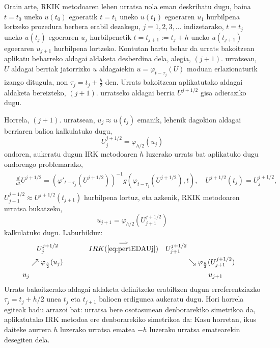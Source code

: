 Orain arte, RKIK metodoaren lehen urratsa nola eman deskribatu dugu, baina $t=t_0$ uneko $u(t_0)$ egoeratik $t=t_1$ uneko $u(t_1)$ egoeraren $u_1$ hurbilpena lortzeko prozedura berbera erabil dezakegu, $j=1,2,3,\ldots$ indizetarako, $t=t_{j}$ uneko $u(t_j)$ egoeraren $u_j$ hurbilpenetik $t=t_{j+1}:= t_{j}+h$ uneko $u(t_{j+1})$ egoeraren $u_{j+1}$ hurbilpena lortzeko. Kontutan hartu behar da urrats bakoitzean aplikatu beharreko aldagai aldaketa  desberdina dela, alegia, $(j+1)$. urratsean, $U$ aldagai berriak jatorrizko $u$ aldagaiekin $u = \varphi_{t-\tau_j}(U)$ moduan erlazionaturik izango ditugula, non $\tau_j = t_j + \frac{h}{2}$ den. Urrats bakoitzean aplikatutako aldagai aldaketa bereizteko, $(j+1)$. urratseko aldagai berria $U^{j+1/2}$ gisa adieraziko dugu.

 Horrela, $(j+1)$. urratsean, $u_j \approx u(t_j)$ emanik, lehenik dagokion aldagai berriaren balioa kalkulatuko dugu,
\begin{equation*}
U^{j+1/2}_j = \varphi_{h/2}(u_j)
\end{equation*}
%
ondoren, aukeratu dugun IRK metodoaren $h$ luzerako urrats bat aplikatuko dugu ondorengo problemarako,
\begin{align}
\begin{split}
\label{eq:pertEDAUj}
&\frac{d}{dt} U^{j+1/2} = \left(\varphi'_{t-\tau_j}(U^{j+1/2})\right)^{-1} g\left(\varphi_{t-\tau_j}(U^{j+1/2}),t \right), \quad U^{j+1/2}(t_j) = U^{j+1/2}_j,
\end{split}
\end{align}
%
$U^{j+1/2}_{j+1} \approx U^{j+1/2}(t_{j+1})$ hurbilpena lortuz, eta azkenik, RKIK metodoaren urratsa bukatzeko,
%
\begin{equation*}
u_{j+1} = \varphi_{h/2}(U^{j+1/2}_{j+1})
\end{equation*}
%
kalkulatuko dugu.  Laburbilduz:
%
\begin{align*}
   &   \quad U^{j+1/2}_j \quad \quad \quad \quad \stackrel{\Longrightarrow}{IRK(\ref{eq:pertEDAUj})}  & U^{j+1/2}_{j+1}&  &\\
  & \nearrow \varphi_{\frac{h}{2}}(u_j) &            & \searrow \varphi_{\frac{h}{2}}(U^{j+1/2}_{j+1})& \\
u_j &                  &    &\quad \quad \quad  u_{j+1}
\end{align*}
%
Urrats bakoitzerako aldagai aldaketa definitzeko erabiltzen dugun erreferentziazko $\tau_j=t_j+h/2$ unea $t_j$ eta $t_{j+1}$ balioen erdigunea aukeratu dugu. Hori horrela egiteak badu arrazoi bat: urratsa bere osotasunean denborarekiko simetrikoa da, aplikatutako IRK metodoa ere denborarekiko simetrikoa da: Kasu horretan, ikus daiteke aurrera $h$ luzerako urratsa ematea $-h$ luzerako urratsa ematearekin desegiten dela.




